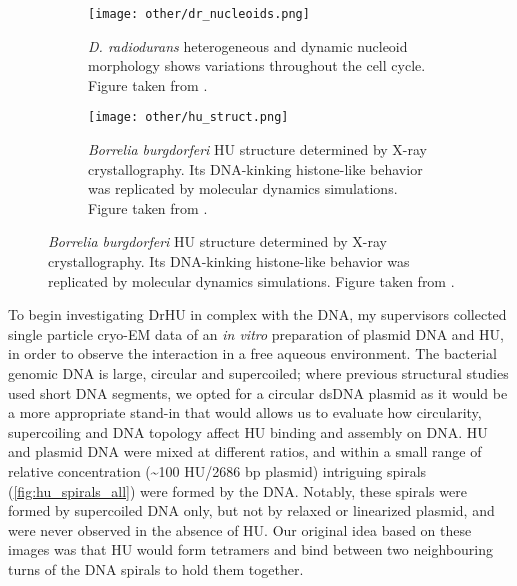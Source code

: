 \begin{figure}[ht]
    \centering
    \begin{subfigure}[B]{.48\textwidth}
        \centering
        \texttt{[image: other/dr\_nucleoids.png]}
        \caption{\textit{D. radiodurans} heterogeneous and dynamic nucleoid morphology shows variations throughout the cell cycle. Figure taken from \citet{flochCellMorphologyNucleoid2019}.}
        \label{fig:hu_nucleoids}
    \end{subfigure}%
    \hfill
    \begin{subfigure}[B]{.5\textwidth}
        \centering
        \texttt{[image: other/hu\_struct.png]}
        \caption{\textit{Borrelia burgdorferi} HU structure determined by X-ray crystallography. Its DNA-kinking histone-like behavior was replicated by molecular dynamics simulations. Figure taken from \citet{hognonMolecularBasesDNA2019}.}
        \label{fig:hu_structure}
    \end{subfigure}%
    \label{fig:hu}
\end{figure}

To begin investigating DrHU in complex with the DNA, my supervisors collected single particle cryo-EM data of an \textit{in vitro} preparation of plasmid DNA and HU, in order to observe the interaction in a free aqueous environment.
The bacterial genomic DNA is large, circular and supercoiled; where previous structural studies used short DNA segments, we opted for a circular dsDNA plasmid as it would be a more appropriate stand-in that would allows us to evaluate how circularity, supercoiling and DNA topology affect HU binding and assembly on DNA.
HU and plasmid DNA were mixed at different ratios, and within a small range of relative concentration (\sim100 HU/2686 bp plasmid) intriguing spirals (\autoref{fig:hu_spirals_all}) were formed by the DNA.
Notably, these spirals were formed by supercoiled DNA only, but not by relaxed or linearized plasmid, and were never observed in the absence of HU.
Our original idea based on these images was that HU would form tetramers and bind between two neighbouring turns of the DNA spirals to hold them together.

